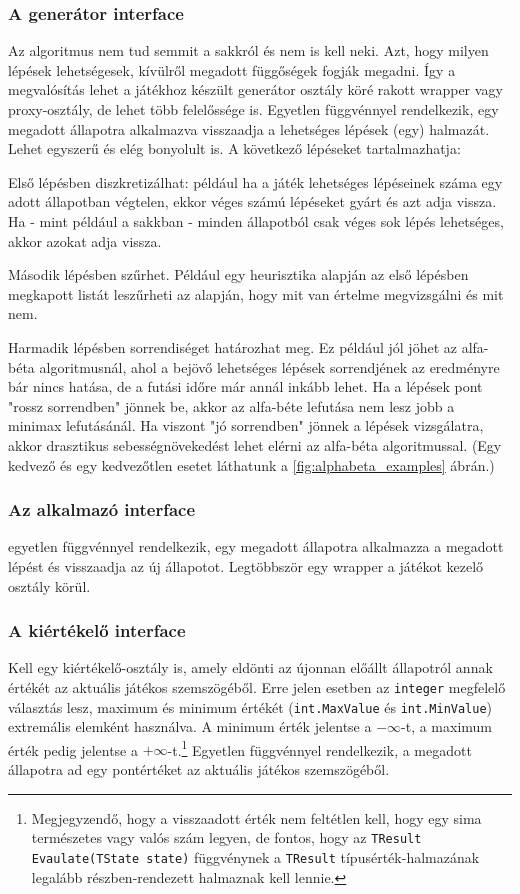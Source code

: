 \documentclass[twoside, a4paper, 12pt]{book}
\begin{document}
\subsubsection{A generátor interface} Az algoritmus nem tud semmit a sakkról és nem is kell neki. Azt, hogy milyen lépések lehetségesek, kívülről megadott függőségek fogják megadni. Így a megvalósítás lehet a játékhoz készült generátor osztály köré rakott wrapper vagy proxy-osztály, de lehet több felelőssége is. Egyetlen függvénnyel rendelkezik, egy megadott állapotra alkalmazva visszaadja a lehetséges lépések (egy) halmazát. Lehet egyszerű és elég bonyolult is. A következő lépéseket tartalmazhatja:

Első lépésben diszkretizálhat: például ha a játék lehetséges lépéseinek száma egy adott állapotban végtelen, ekkor véges számú lépéseket gyárt és azt adja vissza. Ha - mint például a sakkban - minden állapotból csak véges sok lépés lehetséges, akkor azokat adja vissza.

Második lépésben szűrhet. Például egy heurisztika alapján az első lépésben megkapott listát leszűrheti az alapján, hogy mit van értelme megvizsgálni és mit nem.

Harmadik lépésben sorrendiséget határozhat meg. Ez például jól jöhet az alfa-béta algoritmusnál, ahol a bejövő lehetséges lépések sorrendjének az eredményre bár nincs hatása, de a futási időre már annál inkább lehet. Ha a lépések pont "rossz sorrendben" jönnek be, akkor az alfa-béte lefutása nem lesz jobb a minimax lefutásánál. Ha viszont "jó sorrendben" jönnek a lépések vizsgálatra, akkor drasztikus sebességnövekedést lehet elérni az alfa-béta algoritmussal. (Egy kedvező és egy kedvezőtlen esetet láthatunk a \ref{fig:alphabeta_examples} ábrán.)

\subsubsection{Az alkalmazó interface} egyetlen függvénnyel rendelkezik, egy megadott állapotra alkalmazza a megadott lépést és visszaadja az új állapotot. Legtöbbször egy wrapper a játékot kezelő osztály körül.

\subsubsection{A kiértékelő interface}
Kell egy kiértékelő-osztály is, amely eldönti az újonnan előállt állapotról annak értékét az aktuális játékos szemszögéből. Erre jelen esetben az \texttt{integer} megfelelő választás lesz, maximum és minimum értékét (\texttt{int.MaxValue} és \texttt{int.MinValue}) extremális elemként használva. A minimum érték jelentse a $-\infty$-t, a maximum érték pedig jelentse a $+\infty$-t.\footnote{Megjegyzendő, hogy a visszaadott érték nem feltétlen kell, hogy egy sima természetes vagy valós szám legyen, de fontos, hogy az \texttt{TResult Evaulate(TState state)} függvénynek a \texttt{TResult} típusérték-halmazának legalább részben-rendezett halmaznak kell lennie.}
Egyetlen függvénnyel rendelkezik, a megadott állapotra ad egy pontértéket az aktuális játékos szemszögéből.
\end{document}
